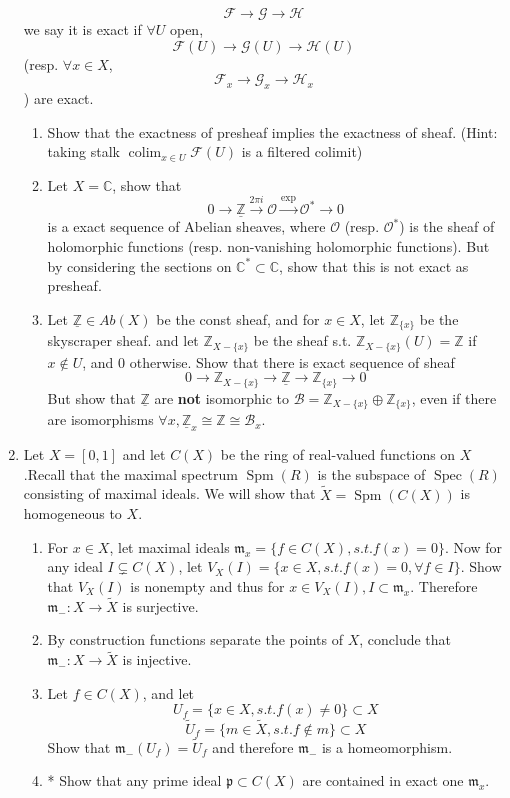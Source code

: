 \documentclass[a4paper,11pt]{article}
\def\bb#1{\mathbb{#1}}
\def\bZ{\mathbb{Z}}
\DeclareMathOperator{\colim}{colim}
\DeclareMathOperator{\Spm}{Spm}
\DeclareMathOperator{\Spec}{Spec}
\begin{document}
\begin{enumerate}[1.]
\[ \mathcal{F}\to\mathcal{G}\to\mathcal{H}\]
we say it is exact if $\forall U$ open,
\[ \mathcal{F}(U)\to\mathcal{G}(U)\to\mathcal{H}(U)\]  
(resp. $\forall x\in X$, \[ \mathcal{F}_x\to\mathcal{G}_x\to\mathcal{H}_x\]) are exact.
\begin{enumerate}
    \item Show that the exactness of presheaf implies the exactness of sheaf. (Hint: taking stalk $\colim_{x\in U}\mathcal{F}(U)$ is a filtered colimit)
    \item Let $X=\bb{C}$, show that 
    \[0\to \underline{\bZ}\xrightarrow{2\pi i}\mathcal{O}\xrightarrow{\exp} \mathcal{O}^*\to 0\]
    is a exact sequence of Abelian sheaves, where $\mathcal{O}$ (resp. $\mathcal{O}^*$) is the sheaf of holomorphic functions (resp. non-vanishing holomorphic functions). But by considering the sections on $\bb{C}^* \subset \bb{C}$, show that this is not exact as presheaf.
    \item Let $\underline{\bZ}\in Ab(X)$ be the const sheaf, and for $x\in X$, let $\bZ_{\{x\}}$ be the skyscraper sheaf. and let $\bZ_{X-\{x\}}$ be the sheaf s.t. $ \bZ_{X-\{x\}}(U)=\bZ$ if $x\notin U$, and $0$ otherwise. Show that there is exact sequence of sheaf 
    \[0\to\bZ_{X-\{x\}}\to \underline{\bZ}\to \bZ_{\{x\}}\to 0 \]
    But show that $\underline{\bZ}$ are \textbf{not} isomorphic to $\mathcal{B}=\bZ_{X-\{x\}}\oplus \bZ_{\{x\}} $, even if there are isomorphisms $\forall x, \underline{\bZ}_x\cong \bZ\cong \mathcal{B}_x$.
\end{enumerate}

\item Let $X=[0,1]$ and let $C(X)$ be the ring of real-valued functions on $X$.Recall that the maximal spectrum $\Spm(R)$ is the subspace of $\Spec(R)$ consisting of maximal ideals. We will show that $\tilde{X}=\Spm(C(X))$ is homogeneous to $X$.
\begin{enumerate}
    \item For $x\in X$, let maximal ideals $\mathfrak{m}_x=\{f\in C(X),s.t. f(x)=0\}$. Now for any ideal $I \subsetneq  C(X)$, let $V_X(I)=\{x\in X, s.t. f(x)=0, \forall f\in I\}$. Show that $V_X(I)$ is nonempty and thus for $x\in V_X(I),I\subset \mathfrak{m}_x$. Therefore $\mathfrak{m}_{-}:X\to \tilde{X}$ is surjective.
    \item By construction functions separate the points of $X$, conclude that $\mathfrak{m}_{-}: X\to \tilde{X}$ is injective.
    \item Let $f\in C(X)$, and let 
    \[U_f=\{x\in X, s.t. f(x)\neq0\}\subset X\]
    \[\tilde{U}_f=\{m\in \tilde{X}, s.t. f\notin m\}\subset X\] 
    Show that $\mathfrak{m}_{-}(U_f)=\tilde{U}_f$ and therefore $\mathfrak{m}_{-}$ is a homeomorphism.
    \item* Show that any prime ideal $\mathfrak{p}\subset C(X)$ are contained in exact one $\mathfrak{m}_{x}$.
\end{enumerate}


\end{enumerate}
\end{document}
